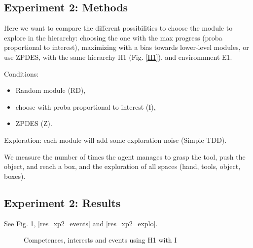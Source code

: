 \documentclass[conference]{include/IEEEtran}
\begin{document}
	
	\subsection{Experiment 2: Methods}	
		
		Here we want to compare the different possibilities to choose the module to explore in the hierarchy: choosing the one with the max progress (proba proportional to interest), 
		maximizing with a bias towards lower-level modules, or use ZPDES,
		with the same hierarchy H1 (Fig. \ref{H1}), and environmnent E1.
			
		Conditions:
		\begin{itemize}
			\item Random module (RD),
			\item choose with proba proportional to interest (I),
			\item ZPDES (Z).
		\end{itemize}
		
		Exploration: each module will add some exploration noise (Simple TDD).
			
		We measure the number of times the agent manages to grasp the tool, push the object, and reach a box,
		and the exploration of all spaces (hand, tools, object, boxes).
		
	
	\subsection{Experiment 2: Results}

		See Fig. \ref{resI}, \ref{res_xp2_events} and \ref{res_xp2_explo}.
		
		\begin{figure}[!t]
			\centering
			\caption{Competences, interests and events using H1 with I}
			\label{resI}
		\end{figure}
		
\end{document}
